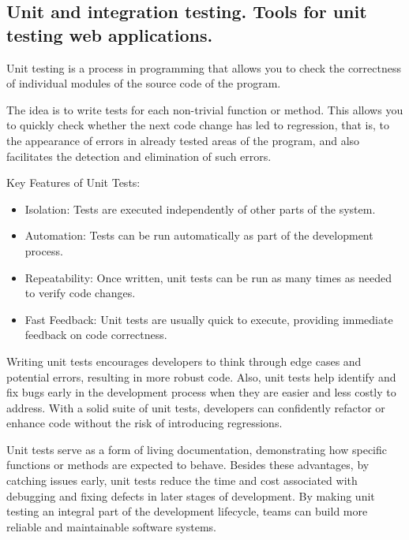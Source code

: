 
\pagebreak
\begin{center}
\section*{Unit and integration testing. Tools for unit testing web applications.}
\end{center}

\medskip

Unit testing is a process in programming that allows you to check the correctness of individual modules of the source code of the program.

The idea is to write tests for each non-trivial function or method. This allows you to quickly check whether the next code change has led to regression, that is, to the appearance of errors in already tested areas of the program, and also facilitates the detection and elimination of such errors.

Key Features of Unit Tests:

\begin{itemize}
\item Isolation: Tests are executed independently of other parts of the system.

\item Automation: Tests can be run automatically as part of the development process.

\item Repeatability: Once written, unit tests can be run as many times as needed to verify code changes.

\item Fast Feedback: Unit tests are usually quick to execute, providing immediate feedback on code correctness.
\end{itemize}

Writing unit tests encourages developers to think through edge cases and potential errors, resulting in more robust code. Also, unit tests help identify and fix bugs early in the development process when they are easier and less costly to address. With a solid suite of unit tests, developers can confidently refactor or enhance code without the risk of introducing regressions.

Unit tests serve as a form of living documentation, demonstrating how specific functions or methods are expected to behave. Besides these advantages, by catching issues early, unit tests reduce the time and cost associated with debugging and fixing defects in later stages of development. By making unit testing an integral part of the development lifecycle, teams can build more reliable and maintainable software systems.

